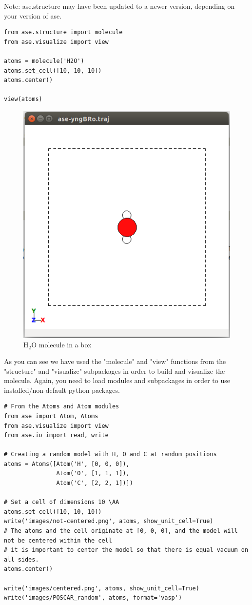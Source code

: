 \documentclass[11pt]{article}
\begin{document}
Note: ase.structure may have been updated to a newer version, depending on your version of ase.
\begin{verbatim}
from ase.structure import molecule
from ase.visualize import view

atoms = molecule('H2O')
atoms.set_cell([10, 10, 10])
atoms.center()

view(atoms)
\end{verbatim}

\begin{figure}[htbp]
\centering
\includegraphics[width=.9\linewidth]{./figures/molec-h2o-ase-ex.png}
\caption{H\(_{\text{2}}\)O molecule in a box}
\end{figure}

As you can see we have used the "molecule" and "view" functions from the "structure" and "visualize" subpackages in order to build and visualize the molecule. Again, you need to load modules and subpackages in order to use installed/non-default python packages.

\begin{verbatim}
# From the Atoms and Atom modules
from ase import Atom, Atoms
from ase.visualize import view
from ase.io import read, write

# Creating a random model with H, O and C at random positions
atoms = Atoms([Atom('H', [0, 0, 0]),
               Atom('O', [1, 1, 1]), 
               Atom('C', [2, 2, 1])])

# Set a cell of dimensions 10 \AA
atoms.set_cell([10, 10, 10])
write('images/not-centered.png', atoms, show_unit_cell=True)
# The atoms and the cell originate at [0, 0, 0], and the model will not be centered within the cell
# it is important to center the model so that there is equal vacuum on all sides.
atoms.center()

write('images/centered.png', atoms, show_unit_cell=True)
write('images/POSCAR_random', atoms, format='vasp')
\end{verbatim}
\end{document}
